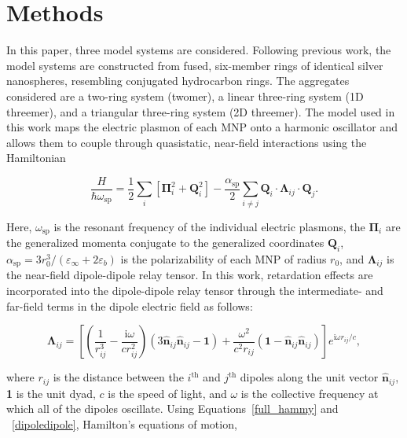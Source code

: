 \documentclass[12pt, letterpaper, twoside]{report}
\begin{document}
\section*{Methods}
In this paper, three model systems are considered. Following previous work\cite{Cherqui2014,Weick2013,Engheta2017}, the model systems are constructed from fused, six-member rings of identical silver nanospheres, resembling conjugated hydrocarbon rings. The aggregates considered are a two-ring system (twomer), a linear three-ring system (1D threemer), and a triangular three-ring system (2D threemer). The model used in this work maps the electric plasmon of each MNP onto a harmonic oscillator and allows them to couple through quasistatic, near-field interactions using the Hamiltonian\cite{Cherqui2014}

\begin{equation}
\frac{H}{\hbar\omega_{\textrm{sp}}} = \frac{1}{2}\sum_{i}\left[\boldsymbol{\Pi}_{i}^2 + \textbf{Q}_{i}^{2}\right] - \frac{\alpha_{\textrm{sp}}}{2}\sum_{i\neq j}\textbf{Q}_{i}\cdot\boldsymbol{\Lambda}_{ij}\cdot\textbf{Q}_{j}.
\label{full_hammy}
\end{equation}

\noindent Here, $\omega_{\textrm{sp}}$ is the resonant frequency of the individual electric plasmons, the $\boldsymbol{\Pi}_{i}$ are the generalized momenta conjugate to the generalized coordinates $\textbf{Q}_{i}$, $\alpha_{\textrm{sp}} = 3r_0^3/(\varepsilon_{\infty}+2\varepsilon_b)$ is the polarizability of each MNP of radius $r_0$, and $\boldsymbol{\Lambda}_{ij}$ is the near-field dipole-dipole relay tensor. In this work, retardation effects are incorporated into the dipole-dipole relay tensor through the intermediate- and far-field terms in the dipole electric field as follows:

\begin{equation}
\boldsymbol{\Lambda}_{ij} = \left[\left(\frac{1}{r_{ij}^3} - \frac{\textrm{i}\omega}{cr_{ij}^2}\right)\left(3\hat{\textbf{n}}_{ij}\hat{\textbf{n}}_{ij} - \textbf{1}\right) + \frac{\omega^2}{c^2r_{ij}}\left(\textbf{1} - \hat{\textbf{n}}_{ij}\hat{\textbf{n}}_{ij}\right)\right]e^{\textrm{i}\omega r_{ij}/c},
\label{dipoledipole}
\end{equation}

\noindent where $r_{ij}$ is the distance between the $i^{\textrm{th}}$ and $j^{\textrm{th}}$ dipoles along the unit vector $\hat{\textbf{n}}_{ij}$, \textbf{1} is the unit dyad, $c$ is the speed of light, and $\omega$ is the collective frequency at which all of the dipoles oscillate. Using Equations~\ref{full_hammy} and ~\ref{dipoledipole}, Hamilton's equations of motion,
\end{document}

